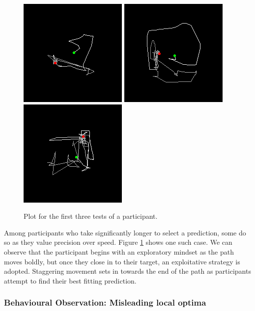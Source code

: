 \documentclass[ %
author={Dillon Keith Diep},
supervisor={Dr. Carl Henrik Ek},
degree={MEng},
title={ART-CG:},
subtitle={Assisted Real-time Content Generation of 3D Hair by Learning Manifolds},
type={Research},
year={2017} ]{dissertation}
\begin{document}
\begin{figure}[!h]
	\centering
	\caption{Plot for the first three tests of a participant.}
	\includegraphics[scale=0.6]{images/experiment/Nick_ONE_REPLOT}
	\includegraphics[scale=0.6]{images/experiment/Nick_TWO_REPLOT}
	\includegraphics[scale=0.6]{images/experiment/Nick_THREE_REPLOT}
	\label{nickresult}
\end{figure}

Among participants who take significantly longer to select a prediction, some do so as they value precision over speed. Figure \ref{nickresult} shows one such case. We can observe that the participant begins with an exploratory mindset as the path moves boldly, but once they close in to their target, an exploitative strategy is adopted. Staggering movement sets in towards the end of the path as participants attempt to find their best fitting prediction.

\subsubsection{Behavioural Observation: Misleading local optima}
\end{document}
